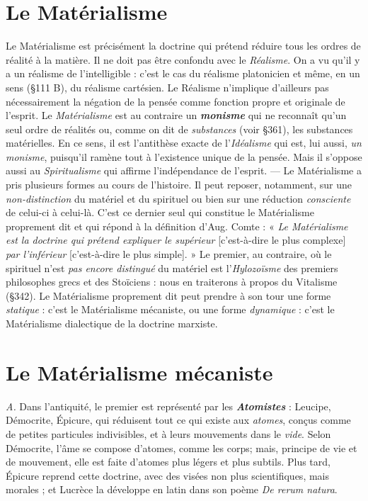 \section{Le Matérialisme}%
Le Matérialisme est précisément la
doctrine qui prétend réduire tous les ordres de réalité à la matière.
Il ne doit pas être confondu avec le {\it Réalisme}. On a vu qu’il y a un
réalisme de l’intelligible : c’est le cas du réalisme platonicien et même,
en un sens (\S 111 B), du réalisme cartésien. Le Réalisme n'implique
d’ailleurs pas nécessairement la négation de la pensée comme fonction
propre et originale de l'esprit. Le {\it Matérialisme} est au contraire un
\textbf{\textit {monisme}} qui ne reconnaît qu’un seul ordre de réalités ou, comme on
dit de {\it substances} (voir \S 361), les substances matérielles. En ce sens,
il est l’antithèse exacte de l’{\it Idéalisme} qui est, lui aussi, {\it un monisme},
puisqu'il ramène tout à l’existence unique de la pensée. Mais il
s'oppose aussi au {\it Spiritualisme} qui affirme l'indépendance de l'esprit.
— Le Matérialisme a pris plusieurs formes au cours de l’histoire. Il
peut reposer, notamment, sur une {\it non-distinction} du matériel et du
spirituel ou bien sur une réduction {\it consciente} de celui-ci à celui-là.
C'est ce dernier seul qui constitue le Matérialisme proprement dit
et qui répond à la définition d’Aug. Comte : « {\it Le Matérialisme est la
doctrine qui prétend expliquer le supérieur} [c’est-à-dire le plus
complexe] {\it par l’inférieur} [c’est-à-dire le plus simple]. » Le premier,
au contraire, où le spirituel n’est {\it pas encore distingué} du matériel est
l'{\it Hylozoïsme} des premiers philosophes grecs et des Stoïciens : nous en
traiterons à propos du Vitalisme (\S 342). Le Matérialisme proprement
dit peut prendre à son tour une forme {\it statique} : c’est le Matérialisme
mécaniste, ou une forme {\it dynamique} : c’est le Matérialisme dialectique
de la doctrine marxiste.

\section{Le Matérialisme mécaniste}%
{\it A.} Dans l'antiquité, le
premier est représenté par les \textbf{\textit {Atomistes}} : Leucipe, Démocrite,
Épicure, qui réduisent tout ce qui existe aux {\it atomes}, conçus comme
de petites particules indivisibles, et à leurs mouvements dans le {\it vide}.
Selon Démocrite, l’âme se compose d’atomes, comme les corps;
mais, principe de vie et de mouvement, elle est faite d’atomes plus
légers et plus subtils. Plus tard, Épicure reprend cette doctrine,
avec des visées non plus scientifiques, mais morales ; et Lucrèce
la développe en latin dans son poème {\it De rerum natura}.

